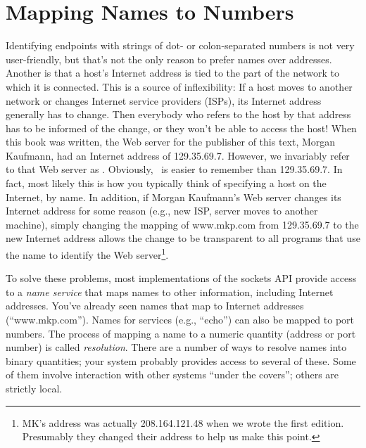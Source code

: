 \section{Mapping Names to Numbers}

Identifying endpoints with strings of dot- or
colon-separated numbers is not very user-friendly, but that's not the
only reason to prefer names over addresses.
Another is that a host's Internet address is tied to the part of the
network to which it is connected.  This is a source of inflexibility:
If a host moves to another network or changes Internet service
providers (ISPs), its Internet address generally has to change.
Then everybody who refers to the host by that address has to
be informed of the change, or they won't be able to access the host!
When this book was written, the Web server for the
publisher of this text, Morgan Kaufmann, had an Internet address of
129.35.69.7.  However, we invariably refer to that Web server as \mkpweb.
Obviously, \mkpweb\ is easier to remember than 129.35.69.7.
In fact, most likely this is how you typically think of specifying a
host on the Internet, by name.  In addition, if Morgan Kaufmann's Web
server changes its Internet address for some reason (e.g., new ISP,
server moves to another machine), simply changing the mapping of
www.mkp.com from 129.35.69.7 to the new Internet address
allows the change to be transparent to all
programs that use the name to identify the Web server\footnote{MK's 
address was actually 208.164.121.48 when we wrote the first edition.
Presumably they changed their address to help us make this point.}.

To solve these problems, most implementations of the sockets API
provide access to a \emph{name service} that maps names to other
information, including Internet addresses.  You've already seen names
that map to Internet addresses (``www.mkp.com'').  Names for services
(e.g., ``echo'') can also be mapped to port numbers.
%
The process of mapping a name to a numeric quantity (address or port
number) is called \emph{resolution}.  There are a number of ways to
resolve names into binary quantities; your system probably provides
access to several of these.  Some of them involve interaction with
other systems ``under the covers''; others are strictly local.

